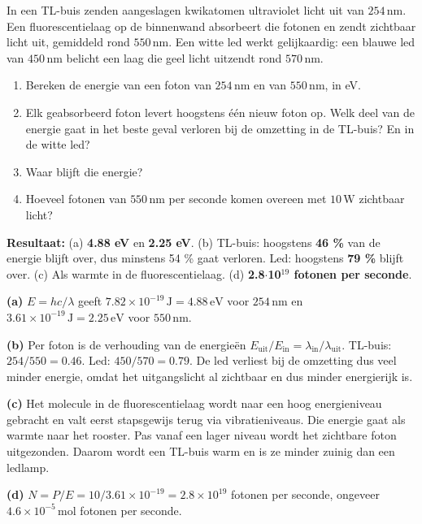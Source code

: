 \begin{oefening}
In een TL-buis zenden aangeslagen kwikatomen ultraviolet licht uit van \(254\,\mathrm{nm}\). Een fluorescentielaag op de binnenwand absorbeert die fotonen en zendt zichtbaar licht uit, gemiddeld rond \(550\,\mathrm{nm}\). Een witte led werkt gelijkaardig: een blauwe led van \(450\,\mathrm{nm}\) belicht een laag die geel licht uitzendt rond \(570\,\mathrm{nm}\).

\begin{enumerate}
\item[(a)]
  Bereken de energie van een foton van \(254\,\mathrm{nm}\) en van \(550\,\mathrm{nm}\), in eV.
\item[(b)]
  Elk geabsorbeerd foton levert hoogstens één nieuw foton op. Welk deel van de energie gaat in het beste geval verloren bij de omzetting in de TL-buis? En in de witte led?
\item[(c)]
  Waar blijft die energie?
\item[(d)]
  Hoeveel fotonen van \(550\,\mathrm{nm}\) per seconde komen overeen met \(10\,\mathrm{W}\) zichtbaar licht?
\end{enumerate}
\end{oefening}
\begin{oplossing}
\textbf{Resultaat:} (a) \textbf{4.88 eV} en \textbf{2.25 eV}. (b) TL-buis: hoogstens \textbf{46 \%} van de energie blijft over, dus minstens 54 \% gaat verloren. Led: hoogstens \textbf{79 \%} blijft over. (c) Als warmte in de fluorescentielaag. (d) \textbf{2.8\ensuremath{\cdot{}}10\ensuremath{^{19}} fotonen per seconde}.

\textbf{(a)} \(E = hc/\lambda\) geeft \(7.82\times10^{-19}\,\mathrm{J} = 4.88\,\mathrm{eV}\) voor \(254\,\mathrm{nm}\) en \(3.61\times10^{-19}\,\mathrm{J} = 2.25\,\mathrm{eV}\) voor \(550\,\mathrm{nm}\).

\textbf{(b)} Per foton is de verhouding van de energieën \(E_{\text{uit}}/E_{\text{in}} = \lambda_{\text{in}}/\lambda_{\text{uit}}\). TL-buis: \(254/550 = 0.46\). Led: \(450/570 = 0.79\). De led verliest bij de omzetting dus veel minder energie, omdat het uitgangslicht al zichtbaar en dus minder energierijk is.

\textbf{(c)} Het molecule in de fluorescentielaag wordt naar een hoog energieniveau gebracht en valt eerst stapsgewijs terug via vibratieniveaus. Die energie gaat als warmte naar het rooster. Pas vanaf een lager niveau wordt het zichtbare foton uitgezonden. Daarom wordt een TL-buis warm en is ze minder zuinig dan een ledlamp.

\textbf{(d)} \(N = P/E = 10/3.61\times10^{-19} = 2.8\times10^{19}\) fotonen per seconde, ongeveer \(4.6\times10^{-5}\,\mathrm{mol}\) fotonen per seconde.
\end{oplossing}

